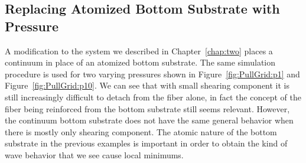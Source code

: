 \subsection{Replacing Atomized Bottom Substrate with Pressure} \label{section:detachment:pressure}

A modification to the system we described in Chapter~\ref{chap:two} places a continuum in place of an atomized bottom substrate. The same simulation procedure is used for two varying pressures shown in Figure~\ref{fig:PullGrid:p1} and Figure~\ref{fig:PullGrid:p10}. We can see that with small shearing component it is still increasingly difficult to detach from the fiber alone, in fact the concept of the fiber being reinforced from the bottom substrate still seems relevant. However, the continuum bottom substrate does not have the same general behavior when there is mostly only shearing component. The atomic nature of the bottom substrate in the previous examples is important in order to obtain the kind of wave behavior that we see cause local minimums.